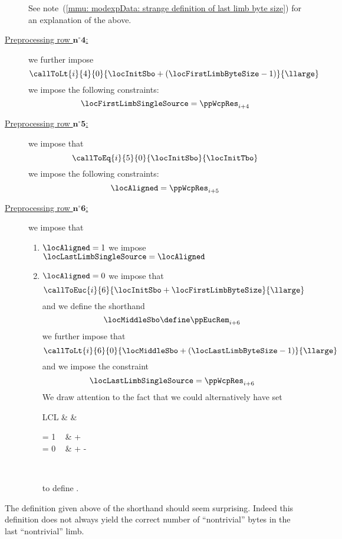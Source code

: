 \begin{description}
\begin{enumerate}
		\end{enumerate}
		See note~(\ref{mmu: modexpData: strange definition of last limb byte size}) for an explanation of the above.
	\item[\underline{Preprocessing row $\bm{n^\circ 4}$:}] 
		we further impose
		\[
			\callToLt
			{i}{4}
			{0}{\locInitSbo + (\locFirstLimbByteSize - 1)}
			{\llarge}
		\]
		we impose the following constraints:
		\[
			\locFirstLimbSingleSource = \ppWcpRes_{i + 4}
		\]
	\item[\underline{Preprocessing row $\bm{n^\circ 5}$:}] 
		we impose that
		\[
			\callToEq
			{i}{5}
			{0}{\locInitSbo}
			{\locInitTbo}
		\]
		we impose the following constraints:
		\[
			\locAligned = \ppWcpRes _{i + 5}
		\]
	\item[\underline{Preprocessing row $\bm{n^\circ 6}$:}]
		we impose that
		\begin{enumerate}
			\item \If $\locAligned = 1$ \Then we impose $\locLastLimbSingleSource = \locAligned$
			\item \If $\locAligned = 0$ \Then
				we impose that
				\[
					\callToEuc
					{i}{6}
					{\locInitSbo + \locFirstLimbByteSize}
					{\llarge}
				\]
				and we define the shorthand
				\[
					\locMiddleSbo \define \ppEucRem_{i + 6}
				\]
				we further impose that
				\[
					\callToLt
					{i}{6}
					{0}{\locMiddleSbo + (\locLastLimbByteSize - 1)}
					{\llarge}
				\]
				and we impose the constraint
				\[
					\locLastLimbSingleSource = \ppWcpRes_{i + 6}
				\]
				\saNote{} We draw attention to the fact that we could alternatively have set
				\begin{IEEEeqnarray*}{LCL}
					\locMiddleSbo
					&  &
					\begin{cases}
						\If \locFirstLimbSingleSource = 1 ~ \Then & \locInitSbo + \locFirstLimbByteSize \\
						\If \locFirstLimbSingleSource = 0 ~ \Then & \locInitSbo + \locFirstLimbByteSize - \llarge \\
					\end{cases} \\
				\end{IEEEeqnarray*}
				to define \locMiddleSbo{}.
		\end{enumerate}
\end{description}
\saNote{} \label{mmu: modexpData: strange definition of last limb byte size}
The definition given above of the shorthand \locLastLimbByteSize{} should seem surprising.
Indeed this definition does not always yield the correct number of ``nontrivial'' bytes in the last ``nontrivial'' limb.
